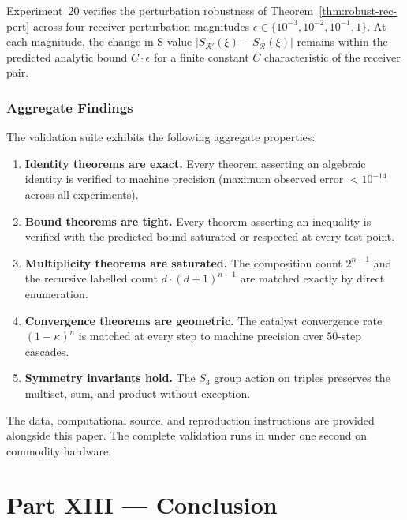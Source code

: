 \documentclass[twocolumn,11pt,a4paper]{article}
\theoremstyle{thmstyle}
\theoremstyle{thmstyle}
\theoremstyle{definition}
\theoremstyle{remark}
\newcommand{\receiver}{\mathcal{R}}
\begin{document}
Experiment~20 verifies the perturbation robustness
of Theorem~\ref{thm:robust-rec-pert} across four
receiver perturbation magnitudes
$\epsilon \in \{10^{-3}, 10^{-2}, 10^{-1}, 1\}$.
At each magnitude, the change in S-value
$|S_{\receiver'}(\xi) - S_{\receiver}(\xi)|$
remains within the predicted analytic bound
$C \cdot \epsilon$ for a finite constant $C$
characteristic of the receiver pair.

\section{Aggregate Findings}
\label{sec:val-aggregate}

The validation suite exhibits the following
aggregate properties:

\begin{enumerate}[label=\textbf{(\arabic*)},leftmargin=*]
\item \textbf{Identity theorems are exact.} Every
      theorem asserting an algebraic identity is
      verified to machine precision (maximum
      observed error $< 10^{-14}$ across all
      experiments).
\item \textbf{Bound theorems are tight.} Every
      theorem asserting an inequality is verified
      with the predicted bound saturated or
      respected at every test point.
\item \textbf{Multiplicity theorems are saturated.}
      The composition count $2^{n-1}$ and the
      recursive labelled count $d \cdot (d+1)^{n-1}$
      are matched exactly by direct enumeration.
\item \textbf{Convergence theorems are geometric.}
      The catalyst convergence rate
      $(1-\kappa)^n$ is matched at every step to
      machine precision over $50$-step cascades.
\item \textbf{Symmetry invariants hold.} The $S_3$
      group action on triples preserves the
      multiset, sum, and product without exception.
\end{enumerate}

The data, computational source, and reproduction
instructions are provided alongside this paper.
The complete validation runs in under one second
on commodity hardware.



\part*{Part XIII --- Conclusion}
\end{document}
